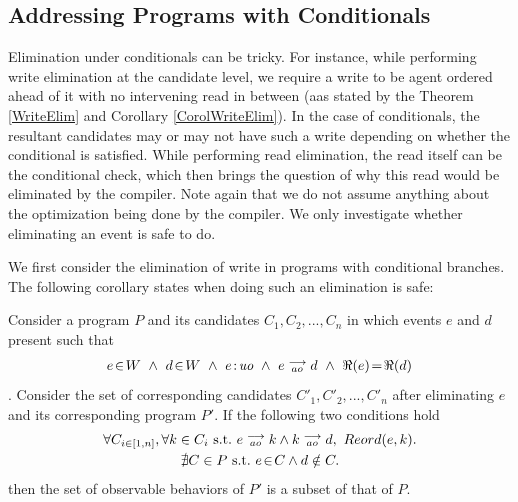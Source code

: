 \subsection{Addressing Programs with Conditionals}
    
    Elimination under conditionals can be tricky. 
    For instance, while performing write elimination at the candidate level, we require a write to be agent ordered ahead of it with no intervening read in between (aas stated by the Theorem \ref{WriteElim} and Corollary \ref{CorolWriteElim}).
    In the case of conditionals, the resultant candidates may or may not have such a write depending on whether the conditional is satisfied. 
    While performing read elimination, the read itself can be the conditional check, which then brings the question of why this read would be eliminated by the compiler.
    Note again that we do not assume anything about the optimization being done by the compiler. 
    We only investigate whether eliminating an event is safe to do.  

    We first consider the elimination of write in programs with conditional branches. The following corollary states when doing such an elimination is safe: 
    \begin{corollary}
        \label{WriteElimCond}
        Consider a program $P$ and its candidates $C_1, C_2, ... , C_n$ in which events $e$ and $d$ present such that 
        \begin{align*}
            \event{e}{W} \ \wedge \ \event{d}{W} \ \wedge \ \et{e}{uo} \ \wedge \ \reln{e}{ao}{d} \ \wedge \ \Re(e)\!=\!\Re(d)
        \end{align*} . 
        Consider the set of corresponding candidates $C'_1, C'_2, ... , C'_n$ after eliminating $e$ and its corresponding program $P'$. If the following two conditions hold
        \begin{gather*}
            \forall C_{i \in [1,n]}, \forall k \in C_i \ \text{s.t.} \ \reln{e}{ao}{k} \wedge \reln{k}{ao}{d}, \    
            Reord(e,k). \label{elim:cond_write1}\\   
            \nexists C \in P \ \text{s.t.} \ \event{e}{C} \wedge d \notin C. \label{elim:cond_write2}
        \end{gather*}
        then the set of observable behaviors of $P'$ is a subset of that of $P$.
    \end{corollary}

